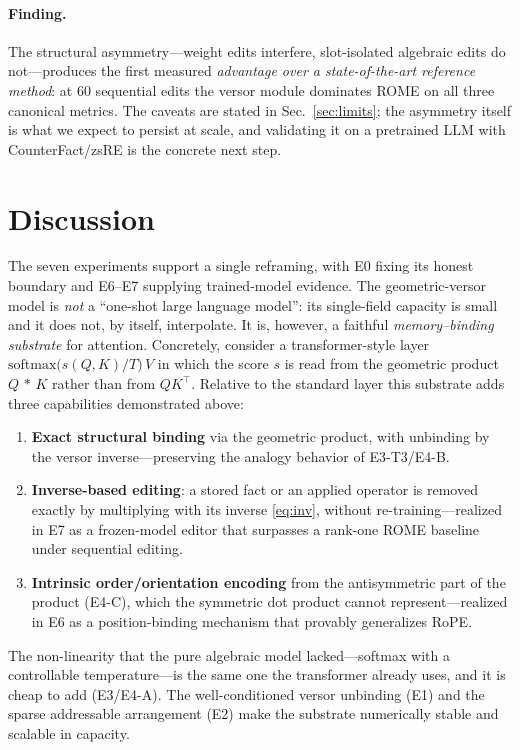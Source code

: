 \documentclass[10pt,twocolumn]{article}
\newcommand{\gp}{\,{*}\,}            %
\begin{document}
\paragraph{Finding.} The structural asymmetry---weight edits interfere,
slot-isolated algebraic edits do not---produces the first measured
\emph{advantage over a state-of-the-art reference method}: at 60 sequential
edits the versor module dominates ROME on all three canonical metrics. The
caveats are stated in Sec.~\ref{sec:limits}; the asymmetry itself is what we
expect to persist at scale, and validating it on a pretrained LLM with
CounterFact/zsRE is the concrete next step.

\section{Discussion}
The seven experiments support a single reframing, with E0 fixing its honest
boundary and E6--E7 supplying trained-model evidence. The geometric-versor model is
\emph{not} a ``one-shot large language model'': its single-field capacity is
small and it does not, by itself, interpolate. It is, however, a faithful
\emph{memory--binding substrate} for attention. Concretely, consider a
transformer-style layer
$\mathrm{softmax}\!\big(s(Q,K)/T\big)\,V$ in which the score $s$ is read from the
geometric product $Q\gp K$ rather than from $Q K^\top$. Relative to the standard
layer this substrate adds three capabilities demonstrated above:
\begin{enumerate}[leftmargin=1.3em,itemsep=2pt,topsep=2pt]
\item \textbf{Exact structural binding} via the geometric product, with
unbinding by the versor inverse---preserving the analogy behavior of E3-T3/E4-B.
\item \textbf{Inverse-based editing}: a stored fact or an applied operator is
removed exactly by multiplying with its inverse \eqref{eq:inv}, without
re-training---realized in E7 as a frozen-model editor that surpasses a rank-one
ROME baseline under sequential editing.
\item \textbf{Intrinsic order/orientation encoding} from the antisymmetric part
of the product (E4-C), which the symmetric dot product cannot represent---realized
in E6 as a position-binding mechanism that provably generalizes RoPE.
\end{enumerate}
The non-linearity that the pure algebraic model lacked---softmax with a
controllable temperature---is the same one the transformer already uses, and it
is cheap to add (E3/E4-A). The well-conditioned versor unbinding (E1) and the
sparse addressable arrangement (E2) make the substrate numerically stable and
scalable in capacity.
\end{document}
